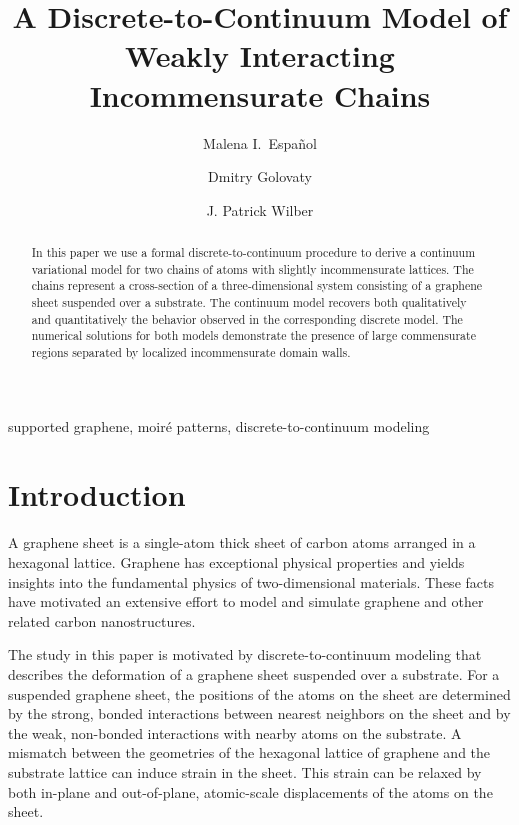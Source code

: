 \documentclass{siamltex}
\title{A Discrete-to-Continuum Model of Weakly Interacting
  Incommensurate Chains}
\author{
    Malena I.~Espa\~ nol\footnotemark[1]
\and
    Dmitry Golovaty\footnotemark[1]
\and
    J. Patrick Wilber\footnotemark[1]}
\begin{document}
\maketitle

\renewcommand{\thefootnote}{\fnsymbol{footnote}}

\begin{abstract}
In this paper we use a formal discrete-to-continuum procedure to derive a continuum variational model for two chains of atoms with slightly incommensurate lattices. The chains represent a cross-section of a three-dimensional system consisting of a graphene sheet suspended over a substrate. The continuum model recovers both qualitatively and quantitatively the behavior observed in the corresponding discrete model. The numerical solutions for both models demonstrate the presence of large commensurate regions separated by localized incommensurate domain walls. 
\end{abstract}

\begin{keywords} supported graphene, moir\'e patterns,
  discrete-to-continuum modeling\end{keywords}

\section{Introduction} \label{s1}


A graphene sheet is a single-atom thick sheet of carbon atoms
arranged in a hexagonal lattice.  Graphene has exceptional physical
properties and yields insights into the fundamental physics of
two-dimensional materials.  These facts have motivated an extensive
effort to model and simulate graphene and other related carbon
nanostructures. 


The study in this paper is motivated by discrete-to-continuum modeling that describes
the deformation of a graphene sheet suspended over a substrate.  For a
suspended graphene sheet, the positions of the atoms on the sheet are
determined by the strong, bonded interactions between nearest
neighbors on the sheet and by the weak, non-bonded interactions with
nearby atoms on the substrate.  A mismatch between the geometries of
the hexagonal lattice of graphene and the substrate lattice can induce
strain in the sheet.  This strain can be relaxed by both in-plane and
out-of-plane, atomic-scale displacements of the atoms on the sheet.
\end{document}
